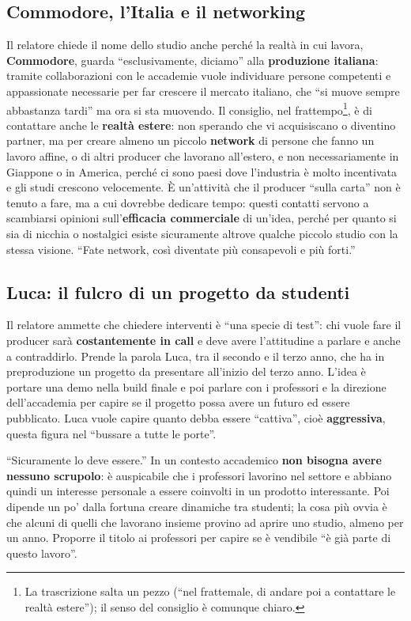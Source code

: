 \subsection{Commodore, l'Italia e il networking}

Il relatore chiede il nome dello studio anche perché la realtà in cui lavora,
\textbf{Commodore}, guarda ``esclusivamente, diciamo'' alla \textbf{produzione
italiana}: tramite collaborazioni con le accademie vuole individuare persone
competenti e appassionate necessarie per far crescere il mercato italiano, che
``si muove sempre abbastanza tardi'' ma ora si sta muovendo. Il consiglio, nel
frattempo\footnote{La trascrizione salta un pezzo (``nel frattemale, di andare
poi a contattare le realtà estere''); il senso del consiglio è comunque
chiaro.}, è di contattare anche le \textbf{realtà estere}: non sperando che vi
acquisiscano o diventino partner, ma per creare almeno un piccolo
\textbf{network} di persone che fanno un lavoro affine, o di altri producer che
lavorano all'estero, e non necessariamente in Giappone o in America, perché ci
sono paesi dove l'industria è molto incentivata e gli studi crescono
velocemente. È un'attività che il producer ``sulla carta'' non è tenuto a fare,
ma a cui dovrebbe dedicare tempo: questi contatti servono a scambiarsi opinioni
sull'\textbf{efficacia commerciale} di un'idea, perché per quanto si sia di
nicchia o nostalgici esiste sicuramente altrove qualche piccolo studio con la
stessa visione. ``Fate network, così diventate più consapevoli e più forti.''

\subsection{Luca: il fulcro di un progetto da studenti}

Il relatore ammette che chiedere interventi è ``una specie di test'': chi vuole
fare il producer sarà \textbf{costantemente in call} e deve avere l'attitudine a
parlare e anche a contraddirlo. Prende la parola Luca, tra il secondo e il terzo
anno, che ha in preproduzione un progetto da presentare all'inizio del terzo
anno. L'idea è portare una demo nella build finale e poi parlare con i
professori e la direzione dell'accademia per capire se il progetto possa avere
un futuro ed essere pubblicato. Luca vuole capire quanto debba essere
``cattiva'', cioè \textbf{aggressiva}, questa figura nel ``bussare a tutte le
porte''.

``Sicuramente lo deve essere.'' In un contesto accademico \textbf{non bisogna
avere nessuno scrupolo}: è auspicabile che i professori lavorino nel settore e
abbiano quindi un interesse personale a essere coinvolti in un prodotto
interessante. Poi dipende un po' dalla fortuna creare dinamiche tra studenti;
la cosa più ovvia è che alcuni di quelli che lavorano insieme provino ad aprire
uno studio, almeno per un anno. Proporre il titolo ai professori per capire se è
vendibile ``è già parte di questo lavoro''.

